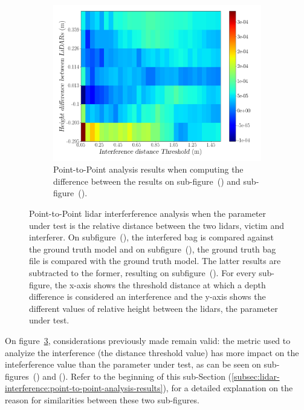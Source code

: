 \begin{figure}[!ht]
\begin{subfigure}[c]{0.45\textwidth}
		\label{fig:height:ground-truth-color-mesh}
	\end{subfigure}
	\\ \vspace{4mm}
	\begin{subfigure}[c]{0.8\textwidth}
		\includegraphics[width=\textwidth]{img/lidar-interference/height/difference_ground_truth_interference_measurement.png}
		\caption{Point-to-Point analysis results when computing the difference between the results on sub-figure~() and sub-figure~().}
		\label{fig:height:difference-color-mesh}
	\end{subfigure}

	\caption{Point-to-Point \ac{lidar} interferference analysis when the parameter under test is the relative distance between the two \acp{lidar}, victim and interferer. On subfigure~(), the interfered bag is compared against the ground truth model and on subfigure~(), the ground truth bag file is compared with the ground truth model. The latter results are subtracted to the former, resulting on subfigure~(). For every sub-figure, the x-axis shows the threshold distance at which a depth difference is considered an interference and the y-axis shows the different values of relative height between the \acp{lidar}, the parameter under test.}
	\label{fig:height:color-mesh}
\end{figure}


On figure~\ref{fig:height:color-mesh}, considerations previously made remain valid: the metric used to analyize the interference (the distance threshold value) has more impact on the inteferference value than the parameter under test, as can be seen on sub-figures~() and (). Refer to the beginning of this sub-Section (\ref{subsec:lidar-interference:point-to-point-analysis-results}), for a detailed explanation on the reason for similarities between these two sub-figures. 

